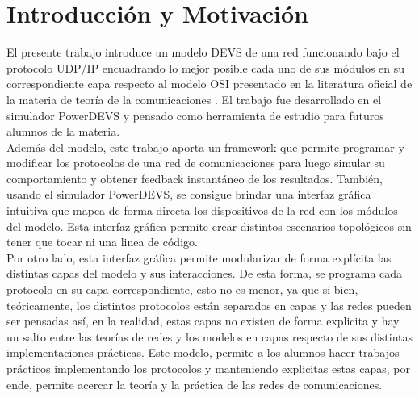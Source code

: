 \documentclass[10pt,a4paper]{article}
\begin{document}
	


\fecha{\today}



\maketitle

\tableofcontents
\newpage

\section{Introducción y Motivación}

El presente trabajo introduce un modelo DEVS de una red funcionando bajo el protocolo UDP/IP encuadrando lo mejor posible cada uno de sus módulos en su correspondiente capa respecto al modelo OSI presentado en la literatura oficial de la materia de teoría de la comunicaciones \cite{peterson2011computer}. El trabajo fue desarrollado en el simulador PowerDEVS y pensado como herramienta de estudio para futuros alumnos de la materia. \\

Además del modelo, este trabajo aporta un framework que permite programar y modificar los protocolos de una red de comunicaciones para luego simular su comportamiento y obtener feedback instantáneo de los resultados. También, usando el simulador PowerDEVS, se consigue brindar una interfaz gráfica intuitiva que mapea de forma directa los dispositivos de la red con los módulos del modelo. Esta interfaz gráfica permite crear distintos escenarios topológicos sin tener que tocar ni una linea de código. \\

Por otro lado, esta interfaz gráfica permite modularizar de forma explícita las distintas capas del modelo y sus interacciones. De esta forma, se programa cada protocolo en su capa correspondiente, esto no es menor, ya que si bien, teóricamente, los distintos protocolos están separados en capas y las redes pueden ser pensadas así, en la realidad, estas capas no existen de forma explicita y hay un salto entre las teorías de redes y los modelos en capas respecto de sus distintas implementaciones prácticas. Este modelo, permite a los alumnos hacer trabajos prácticos implementando los protocolos y manteniendo explicitas estas capas, por ende, permite acercar la teoría y la práctica de las redes de comunicaciones. \\
\end{document}

